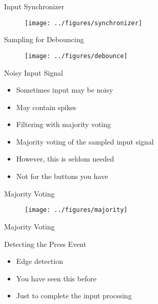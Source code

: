 \begin{frame}[fragile]{Input Synchronizer}
\begin{figure}
  \texttt{[image: ../figures/synchronizer]}
\end{figure}
\end{frame}



\begin{frame}[fragile]{Sampling for Debouncing}
\begin{figure}
  \texttt{[image: ../figures/debounce]}
\end{figure}
\end{frame}


\begin{frame}[fragile]{Noisy Input Signal}
\begin{itemize}
\item Sometimes input may be noisy
\item May contain spikes
\item Filtering with majority voting
\item Majority voting of the sampled input signal
\item However, this is seldom needed
\item Not for the buttons you have
\end{itemize}
\end{frame}


\begin{frame}[fragile]{Majority Voting}
\begin{figure}
  \texttt{[image: ../figures/majority]}
\end{figure}
\end{frame}


\begin{frame}[fragile]{Majority Voting}
\end{frame}

\begin{frame}[fragile]{Detecting the Press Event}
\begin{itemize}
\item Edge detection
\item You have seen this before
\item Just to complete the input procssing
\end{itemize}
\end{frame}


